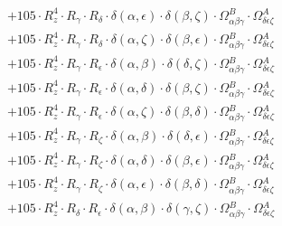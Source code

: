 \documentclass{article}
\begin{document}
\begin{equation}
\begin{array}{c}
 \\[0.2em] 		 + 105 \cdot R_{z}^{4} \cdot R_{\gamma{}} \cdot R_{\delta{}} \cdot \delta{}\left(\alpha{}, \epsilon{}\right) \cdot \delta{}\left(\beta{}, \zeta{}\right) \cdot \Omega{}^{B}_{\alpha{}\beta{}\gamma{}} \cdot \Omega{}^{A}_{\delta{}\epsilon{}\zeta{}} 
 \\[0.2em] 		 + 105 \cdot R_{z}^{4} \cdot R_{\gamma{}} \cdot R_{\delta{}} \cdot \delta{}\left(\alpha{}, \zeta{}\right) \cdot \delta{}\left(\beta{}, \epsilon{}\right) \cdot \Omega{}^{B}_{\alpha{}\beta{}\gamma{}} \cdot \Omega{}^{A}_{\delta{}\epsilon{}\zeta{}} 
 \\[0.2em] 		 + 105 \cdot R_{z}^{4} \cdot R_{\gamma{}} \cdot R_{\epsilon{}} \cdot \delta{}\left(\alpha{}, \beta{}\right) \cdot \delta{}\left(\delta{}, \zeta{}\right) \cdot \Omega{}^{B}_{\alpha{}\beta{}\gamma{}} \cdot \Omega{}^{A}_{\delta{}\epsilon{}\zeta{}} 
 \\[0.2em] 		 + 105 \cdot R_{z}^{4} \cdot R_{\gamma{}} \cdot R_{\epsilon{}} \cdot \delta{}\left(\alpha{}, \delta{}\right) \cdot \delta{}\left(\beta{}, \zeta{}\right) \cdot \Omega{}^{B}_{\alpha{}\beta{}\gamma{}} \cdot \Omega{}^{A}_{\delta{}\epsilon{}\zeta{}} 
 \\[0.2em] 		 + 105 \cdot R_{z}^{4} \cdot R_{\gamma{}} \cdot R_{\epsilon{}} \cdot \delta{}\left(\alpha{}, \zeta{}\right) \cdot \delta{}\left(\beta{}, \delta{}\right) \cdot \Omega{}^{B}_{\alpha{}\beta{}\gamma{}} \cdot \Omega{}^{A}_{\delta{}\epsilon{}\zeta{}} 
 \\[0.2em] 		 + 105 \cdot R_{z}^{4} \cdot R_{\gamma{}} \cdot R_{\zeta{}} \cdot \delta{}\left(\alpha{}, \beta{}\right) \cdot \delta{}\left(\delta{}, \epsilon{}\right) \cdot \Omega{}^{B}_{\alpha{}\beta{}\gamma{}} \cdot \Omega{}^{A}_{\delta{}\epsilon{}\zeta{}} 
 \\[0.2em] 		 + 105 \cdot R_{z}^{4} \cdot R_{\gamma{}} \cdot R_{\zeta{}} \cdot \delta{}\left(\alpha{}, \delta{}\right) \cdot \delta{}\left(\beta{}, \epsilon{}\right) \cdot \Omega{}^{B}_{\alpha{}\beta{}\gamma{}} \cdot \Omega{}^{A}_{\delta{}\epsilon{}\zeta{}} 
 \\[0.2em] 		 + 105 \cdot R_{z}^{4} \cdot R_{\gamma{}} \cdot R_{\zeta{}} \cdot \delta{}\left(\alpha{}, \epsilon{}\right) \cdot \delta{}\left(\beta{}, \delta{}\right) \cdot \Omega{}^{B}_{\alpha{}\beta{}\gamma{}} \cdot \Omega{}^{A}_{\delta{}\epsilon{}\zeta{}} 
 \\[0.2em] 		 + 105 \cdot R_{z}^{4} \cdot R_{\delta{}} \cdot R_{\epsilon{}} \cdot \delta{}\left(\alpha{}, \beta{}\right) \cdot \delta{}\left(\gamma{}, \zeta{}\right) \cdot \Omega{}^{B}_{\alpha{}\beta{}\gamma{}} \cdot \Omega{}^{A}_{\delta{}\epsilon{}\zeta{}} 

\end{array}
\end{equation}
\end{document}
